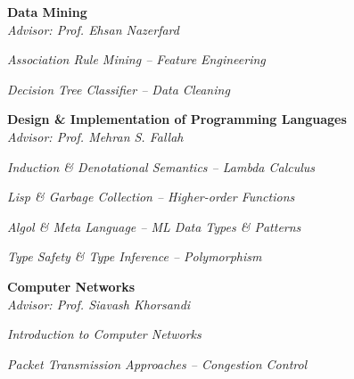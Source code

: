 \documentclass[margin, 10pt]{res} %
\begin{document}
\begin{resume}
\begin{innerlist}
		\end{innerlist}

        \textbf{Data Mining}\\
		\textit{Advisor: Prof. Ehsan Nazerfard}
		\begin{innerlist}
			\item \textit{Association Rule Mining -- Feature Engineering} \href{https://github.com/aligholamee/Datadigger/raw/master/docs/assignment-1/report/DM_9531504_HW1.pdf}{\hfill\UrlFont[docs]}
			
			\item \textit{Decision Tree Classifier -- Data Cleaning} \href{https://github.com/aligholamee/Datadigger/raw/master/docs/assignment-2/report/DM_9531504_HW2.pdf}{\hfill\UrlFont[docs]}
		\end{innerlist}

        \textbf{Design \& Implementation of Programming Languages}\\
    	\textit{Advisor: Prof. Mehran S. Fallah}
	    \begin{innerlist}
	    	\item \textit{Induction \& Denotational Semantics -- Lambda Calculus} \href{https://github.com/aligholamee/HALFLIFE/raw/master/reports/PL29531504.pdf}{\hfill\UrlFont[docs]}
	    	\item \textit{Lisp \& Garbage Collection -- Higher-order Functions} \href{https://github.com/aligholamee/HALFLIFE/raw/master/reports/PL39531504.pdf}{\hfill\UrlFont[docs]}
	    	\item \textit{Algol \& Meta Language -- ML Data Types \& Patterns} \href{https://github.com/aligholamee/HALFLIFE/raw/master/reports/PL49531504.pdf}{\hfill\UrlFont[docs]}
	    	\item \textit{Type Safety \& Type Inference -- Polymorphism} \href{https://github.com/aligholamee/HALFLIFE/raw/master/reports/PL49531504.pdf}{\hfill\UrlFont[docs]}
	    \end{innerlist}

        \textbf{Computer Networks}\\
		\textit{Advisor: Prof. Siavash Khorsandi}
		\begin{innerlist}
			\item \textit{Introduction to Computer Networks} \href{https://github.com/aligholamee/Compnets/raw/master/docs/assignment-1/compnet_assignment_1_9531504.pdf}{\hfill\UrlFont[docs]}
		
			\item \textit{Packet Transmission Approaches -- Congestion Control} \href{https://github.com/aligholamee/Compnets/raw/master/docs/assignment-2/compnet_assignment_2_9531504.pdf}{\hfill\UrlFont[docs]}


\end{innerlist}
\end{resume}
\end{document}
